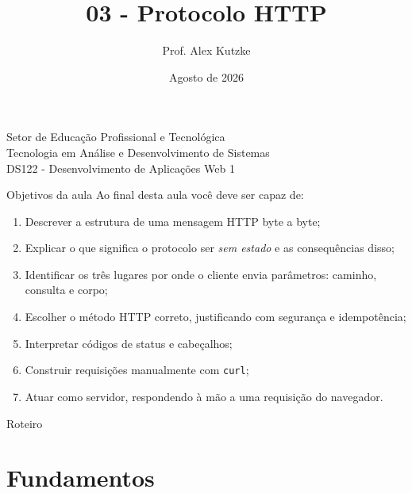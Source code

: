 \documentclass{beamer}
\title{03 - Protocolo HTTP}
\author{Prof. Alex Kutzke}
\date{Agosto de 2026}
\begin{document}
\begin{frame}
  \begin{center}
    \large{Setor de Educação Profissional e Tecnológica}\\
    Tecnologia em Análise e Desenvolvimento de Sistemas\\
    \vspace{1cm}
    \small{DS122 - Desenvolvimento de Aplicações Web 1}
  \end{center}
  \titlepage
\end{frame}

\begin{frame}{Objetivos da aula}
  Ao final desta aula você deve ser capaz de:
  \begin{enumerate}
    \item Descrever a estrutura de uma mensagem HTTP byte a byte;
    \item Explicar o que significa o protocolo ser \textit{sem estado} e as
          consequências disso;
    \item Identificar os três lugares por onde o cliente envia parâmetros:
          caminho, consulta e corpo;
    \item Escolher o método HTTP correto, justificando com segurança e
          idempotência;
    \item Interpretar códigos de status e cabeçalhos;
    \item Construir requisições manualmente com \texttt{curl};
    \item Atuar como servidor, respondendo à mão a uma requisição do navegador.
  \end{enumerate}
\end{frame}

\begin{frame}{Roteiro}
  \tableofcontents
\end{frame}

\section{Fundamentos}
\end{document}
